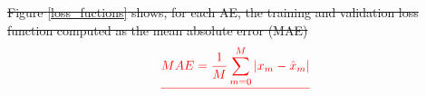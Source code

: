 \documentclass[journal,article,submit,pdftex,moreauthors]{Definitions/mdpi}
\providecommand{\DIFdel}[1]{{\protect\color{red}\sout{#1}}}                      %
\providecommand{\DIFaddbegin}{} %
\providecommand{\DIFdelbegin}{} %
\providecommand{\DIFdelend}{} %
\begin{document}
\DIFdelbegin \DIFdel{Figure \ref{loss_fuctions} shows, for each AE, the training and validation loss function computed as the mean absolute error (MAE)
}\begin{displaymath}
	\DIFdel{MAE = \frac{1}{M}\sum_{m=0}^{M}|x_m - \hat{x}_m|
}\end{displaymath}%
\DIFdelend %
\DIFaddbegin 

\end{document}
